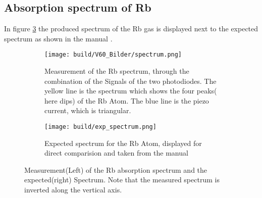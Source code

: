 \subsection{Absorption spectrum of Rb}
In figure \ref{fig:spectrum} the produced spectrum of the Rb gas is displayed next to the expected spectrum as shown in the manual \cite{}.
\begin{figure}
    \centering
    \begin{subfigure}{.5\textwidth}
      \centering
      \texttt{[image: build/V60\_Bilder/spectrum.png]}
      \caption{ Measurement of the Rb spectrum, through the combination of the Signals of the two photodiodes. The yellow line is the spectrum which shows the four peaks( here dips) of the Rb Atom. The blue line is the piezo current, which is triangular.    }
      \label{fig:sub1}
    \end{subfigure}%
    \begin{subfigure}{.5\textwidth}
      \centering
      \texttt{[image: build/exp\_spectrum.png]}
      \caption{Expected spectrum for the Rb Atom, displayed for direct comparision and taken from the manual \cite{} }
      \label{fig:sub2}
    \end{subfigure}
    \caption{ Measurement(Left) of the Rb absorption spectrum and the expected(right) Spectrum. Note that the measured spectrum is inverted along the vertical axis. }
    \label{fig:spectrum}
 \end{figure}
